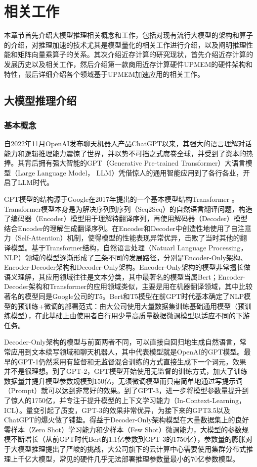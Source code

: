\chapter{相关工作}

本章节首先介绍大模型推理相关概念和工作，包括对现有流行大模型的架构和算子的介绍，对推理加速的技术尤其是模型量化的相关工作进行介绍，以及阐明推理性能和矩阵向量乘算子的关系。其次介绍近存计算的研究现状，首先介绍近存计算的发展历史以及相关工作，然后介绍第一款商用近存计算硬件UPMEM的硬件架构和特性，最后详细介绍各个领域基于UPMEM加速应用的相关工作。

\section{大模型推理介绍}

\subsection{基本概念}
自2022年11月OpenAI发布聊天机器人产品ChatGPT以来，其强大的语言理解对话能力和逻辑推理能力震惊了世界，并以势不可挡之式席卷全球，并受到了资本的热捧。其背后拥有强大智能的GPT（Generative Pre-trained Transformer）大语言模型（Large Language Model， LLM）凭借惊人的通用智能应用到了各行各业，开启了LLM时代。

GPT模型的结构源于Google在2017年提出的一个基本模型结构Transformer \cite{Transformer}。Transformer模型本身是为解决序列到序列（Seq2Seq）的自然语言翻译问题，构造了编码器（Encoder）模型用于理解待翻译序列，再使用解码器（Decoder）模型结合Encoder的理解生成翻译序列。在Encoder和Decoder中创造性地使用了自注意力（Self-Attention）机制，使得模型的性能表现异常优异，击败了当时其他的翻译模型。基于Transformer结构，自然语言处理（Natuarl Language Processing，NLP）领域的模型逐渐形成了三条不同的发展路径，分别是Encoder-Only架构、Encoder-Decoder架构和Decoder-Only架构。Encoder-Only架构的模型非常擅长做语义理解，其应用领域往往是文本分类，其中最著名的模型当属Bert\cite{Bert}；Encoder-Decoder架构和Transformer的应用领域类似，主要是用在机器翻译领域，其中比较著名的模型同是Google公司的T5\cite{T5}。Bert和T5模型在前GPT时代基本确定了NLP模型的预训练+微调的部署范式：由大公司使用大量数据集训练基础通用模型（预训练模型），在此基础上由使用者自行用少量高质量数据微调模型以适应不同的下游任务。

Decoder-Only架构的模型与前面两者不同，可以直接自回归地生成自然语言，常常应用到文本续写领域和聊天机器人，其中代表模型就是OpenAI的GPT模型。最早的GPT-1\cite{GPT-1}仍然采用有监督和无监督混合训练的方式直接生成下一个词元，效果并不是很理想。到了GPT-2\cite{GPT-2}，GPT模型开始使用无监督的训练方式，加大了训练数据量并提升模型参数规模到150亿，无须微调模型而只需简单地通过写提示词（Prompt）就可以达到非常好的效果。到了GPT-3\cite{GPT-3}，进一步将模型参数量提升到了惊人的1750亿，并专注于提升模型的上下文学习能力（In-Context-Learning，ICL）。量变引起了质变，GPT-3的效果非常优异，为接下来的GPT3.5以及ChatGPT的爆火做了铺垫。得益于Decoder-Only架构模型在大量数据集上的良好零样本（Zero Shot）学习能力\cite{Zero-Shot}和少样本（Few Shot）微调能力\cite{Few-Shot}，大模型的参数规模不断增长（从前GPT时代Bert的1.1亿参数到GPT-3的1750亿），参数量的膨胀对于大模型推理提出了严峻的挑战，大公司旗下的云计算中心需要使用集群分布式推理上千亿大模型，常见的硬件几乎无法部署推理参数量最小的70亿参数模型。

